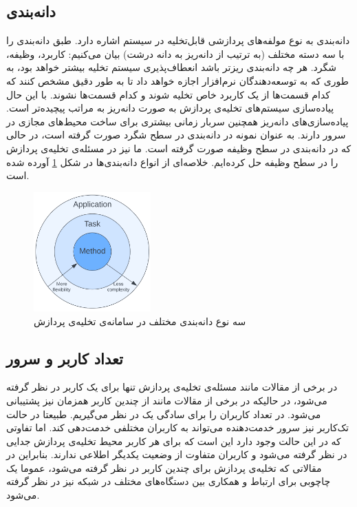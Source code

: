 \subsection{دانه‌بندی}
دانه‌بندی به نوع مولفه‌های پردازشی قابل‌تخلیه در سیستم اشاره دارد. طبق \Cite{wang2019} دانه‌بندی را با سه دسته مختلف (به ترتیب از دانه‌‌ریز به دانه ‌درشت) بیان می‌کنیم: کاربرد، وظیفه، شگرد. هر چه دانه‌بندی ریزتر باشد انعطاف‌پذیری سیستم تخلیه بیشتر خواهد بود، به طوری که به توسعه‌دهندگان نرم‌افزار اجازه خواهد داد تا به طور دقیق مشخص کنند که کدام قسمت‌ها از یک کاربرد خاص تخلیه شوند و کدام قسمت‌ها نشوند. با این حال پیاده‌سازی سیستم‌های تخلیه‌ی پردازش به صورت دانه‌ریز به مراتب پیچیده‌تر است. پیاده‌سازی‌های دانه‌ریز همچنین سربار زمانی بیشتری برای ساخت محیط‌های مجازی در سرور دارند. به عنوان نمونه در \Cite{maui} دانه‌بندی در سطح شگرد صورت گرفته است، در حالی که در \Cite{Liu} دانه‌بندی در سطح وظیفه صورت گرفته است. ما نیز در \CurrentProject مسئله‌ی تخلیه‌ی پردازش را در سطح وظیفه حل کرده‌ایم. خلاصه‌ای از انواع دانه‌بندی‌ها در شکل \ref{fig:granularity} آورده شده است.
\begin{figure}[H]
	\centering
	\includegraphics[width=0.4\textwidth]{figures/granularity.png}
	\caption{سه نوع دانه‌بندی مختلف در سامانه‌ی تخلیه‌ی پردازش}
	\label{fig:granularity}
\end{figure}

\subsection{تعداد کاربر و سرور}
در برخی از مقالات مانند \Cite{Liu} مسئله‌ی تخلیه‌ی پردازش تنها برای یک کاربر در نظر گرفته می‌شود، در حالیکه در برخی از مقالات مانند \Cite{multiuser} از چندین کاربر همزمان نیز پشتیبانی می‌شود. در \CurrentProject تعداد کاربران را برای سادگی یک در نظر می‌گیریم. طبیعتا در حالت تک‌کاربر نیز سرور خدمت‌دهنده می‌تواند به کاربران مختلفی خدمت‌دهی کند. اما تفاوتی که در این حالت وجود دارد این است که برای هر کاربر محیط تخلیه‌ی پردازش جدایی در نظر گرفته می‌شود و کاربران متفاوت از وضعیت یکدیگر اطلاعی ندارند. بنابراین در مقالاتی که تخلیه‌ی پردازش برای چندین کاربر در نظر گرفته می‌شود، عموما یک چاچوبی برای ارتباط و همکاری بین دستگاه‌های مختلف در شبکه نیز در نظر گرفته می‌شود. \\

